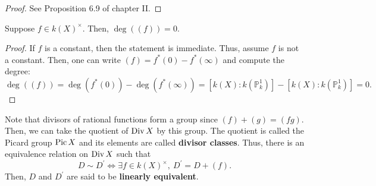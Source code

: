 \begin{proof}
  See Proposition 6.9 of \cite{hartshorne} chapter II.
\end{proof}
\begin{cor}\label{cor:rational_deg_zero}
  Suppose $f\in k(X)^{\times}$. Then, $\deg\left((f)\right)=0$.
\end{cor}
\begin{proof}
  If $f$ is a constant, then the statement is immediate. Thus, assume
  $f$ is not a constant. Then, one can write
  $(f)=f^{\ast}(0)-f^{\ast}(\infty)$ and compute the degree:
  \[
    \deg\left((f)\right)=\deg(f^{\ast}(0))-\deg(f^{\ast}(\infty))
    =[k(X):k(\mathbb{P}^{1}_{k})]-[k(X):k(\mathbb{P}^{1}_{k})]=0.
  \]
\end{proof}
\begin{rem}
  Note that divisors of rational functions form a group since
  $(f)+(g)=(fg)$. Then, we can take the quotient of $\operatorname{Div} X$ by this group.
  The quotient is called the Picard group $\operatorname{Pic} X$ and its elements are
  called \textbf{divisor classes}. Thus, there is an equivalence relation on
  $\operatorname{Div} X$ such that
  \[
    D\sim D^{\prime}\iff \exists f\in k(X)^{\times},\ D^{\prime}=D+(f).
  \]
  Then, $D$ and $D^{\prime}$ are said to be \textbf{linearly equivalent}.
\end{rem}

